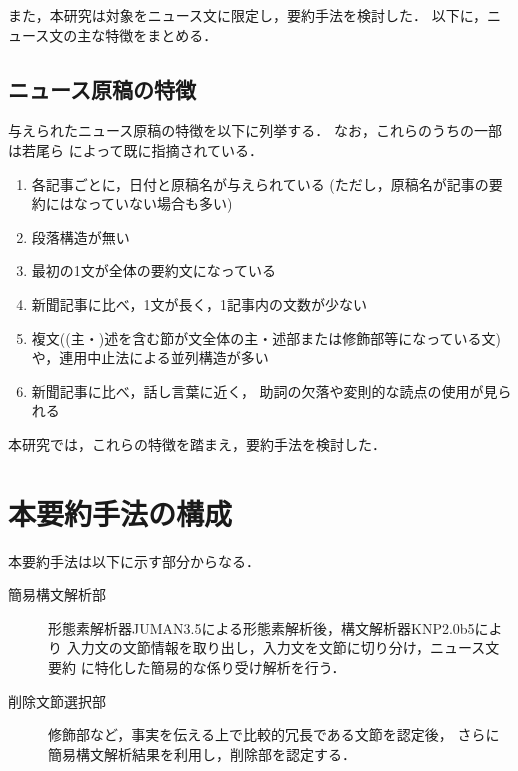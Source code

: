 また，本研究は対象をニュース文に限定し，要約手法を検討した．
以下に，ニュース文の主な特徴をまとめる．

\subsection*{ニュース原稿の特徴}
\label{section:tokucho}

与えられたニュース原稿の特徴を以下に列挙する．
なお，これらのうちの一部は若尾ら\cite{WakaoAndEharaAndMurakiAndShirai1997}
によって既に指摘されている．
\begin{enumerate} 
 \item 各記事ごとに，日付と原稿名が与えられている
       (ただし，原稿名が記事の要約にはなっていない場合も多い)
 \item 段落構造が無い\cite{WakaoAndEharaAndMurakiAndShirai1997}
 \item 最初の1文が全体の要約文になっている
       \cite{WakaoAndEharaAndMurakiAndShirai1997}
 \item 新聞記事に比べ，1文が長く，1記事内の文数が少ない
       \cite{WakaoAndEharaAndMurakiAndShirai1997}
 \item 複文((主・)述を含む節が文全体の主・述部または修飾部等になっている文)
       や，連用中止法による並列構造が多い
 \item 新聞記事に比べ，話し言葉に近く，
       助詞の欠落や変則的な読点の使用が見られる
\end{enumerate}
本研究では，これらの特徴を踏まえ，要約手法を検討した．

\section{本要約手法の構成}
\label{section:shuhokousei}

本要約手法は以下に示す部分からなる．

\begin{description}

 \item[簡易構文解析部]

      形態素解析器JUMAN3.5による形態素解析後，構文解析器KNP2.0b5により
      入力文の文節情報を取り出し，入力文を文節に切り分け，ニュース文要約
      に特化した簡易的な係り受け解析を行う．

 \item[削除文節選択部]

      修飾部など，事実を伝える上で比較的冗長である文節を認定後，
      さらに簡易構文解析結果を利用し，削除部を認定する．

\end{description}

